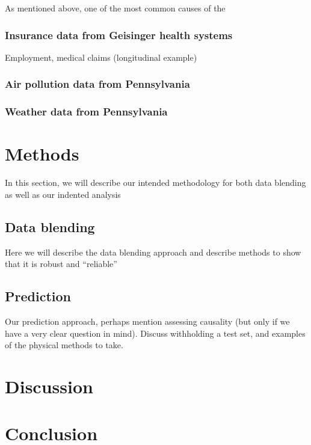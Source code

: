 \documentclass{article}
\begin{document}
As mentioned above, one of the most common causes of the


\subsubsection{Insurance data from Geisinger health systems}
Employment, medical claims (longitudinal example)


\subsubsection{Air pollution data from Pennsylvania}


\subsubsection{Weather data from Pennsylvania}


\section{Methods}

In this section, we will describe our intended methodology for both data blending as well as our indented analysis

\subsection{Data blending}

Here we will describe the data blending approach and describe methods to show that it is robust and ``reliable''

\subsection{Prediction}

Our prediction approach, perhaps mention assessing causality (but only if we have a very clear question in mind). Discuss withholding a test set, and examples of the physical methods to take.


\section{Discussion}



\section{Conclusion}
\end{document}
